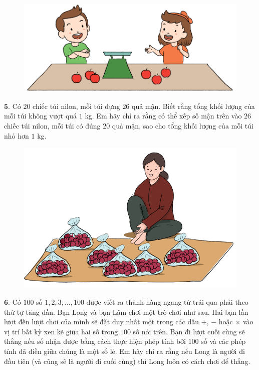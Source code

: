 \begin{multicols}{2}
\begin{figure}[H]
		\includegraphics[width=1\linewidth]{Pi9_bai4}
		\vspace*{-15pt}
	\end{figure}
	$\pmb{5.}$ Có $20$ chiếc túi nilon, mỗi túi đựng $26$ quả mận. Biết rằng tổng khối lượng của mỗi túi không vượt quá $1$ kg. Em hãy chỉ ra rằng có thể xếp số mận trên vào $26$ chiếc túi nilon, mỗi túi có đúng $20$ quả mận, sao cho tổng khối lượng của mỗi túi nhỏ hơn $1$ kg.
	\begin{figure}[H]
		\centering
		\vspace*{-5pt}
		\captionsetup{labelformat= empty, justification=centering}
		\includegraphics[width=0.8\linewidth]{Pi9_bai5}
		\vspace*{-5pt}
	\end{figure}
	$\pmb{6.}$ 	Có $100$ số $1, 2, 3, \ldots, 100$ được viết ra thành hàng ngang từ trái qua phải theo thứ tự tăng dần. Bạn Long và bạn Lâm chơi một trò chơi như sau. Hai bạn lần lượt đến lượt chơi của mình sẽ đặt duy nhất một trong các dấu $+$, $-$ hoặc $\times$ vào vị trí bất kỳ xen kẽ giữa hai số trong $100$ số nói trên. Bạn đi lượt cuối cùng sẽ thắng nếu số nhận được bằng cách thực hiện phép tính bởi $100$ số và các phép tính đã điền giữa chúng là một số lẻ. Em hãy chỉ ra rằng nếu Long là người đi đầu tiên (và cũng sẽ là người đi cuối cùng) thì Long luôn có cách chơi để thắng.
	\begin{figure}[H]

\end{figure}
\end{multicols}
